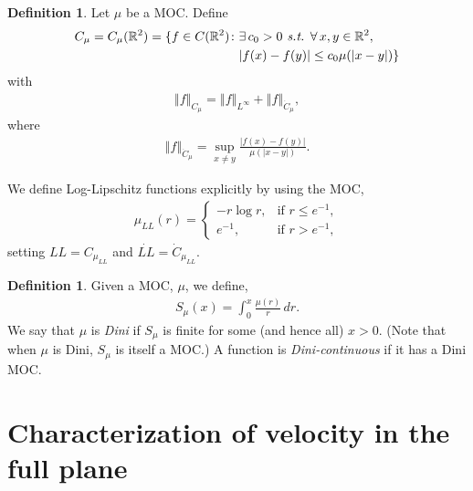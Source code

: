 \documentclass[reqno,openright,11pt,twoside]{amsart}
\theoremstyle{definition}
\newtheorem{definition}[theorem]{Definition}
\numberwithin{equation}{section}
\DeclarePairedDelimiter{\setMultiLine}{\{}{\}}
\begin{document}
\begin{definition}\label{D:Cmu}
	Let $\mu$ be a MOC. Define
	\begin{align*}
	    C_\mu
	        = C_\mu({\ensuremath{{\ensuremath{\mathbb{{R}}}}}}^2)
			= \setMultiLine{f \in C({\ensuremath{{\ensuremath{\mathbb{{R}}}}}}^2) \colon &\exists \, c_0 > 0
			    \textit{ s.t. } \forall \, x, y \in {\ensuremath{{\ensuremath{\mathbb{{R}}}}}}^2, \\
			    &{\left\vert{f(x) - f(y)}\right\vert} \le c_0 \mu({\left\vert{x - y}\right\vert})}
	\end{align*}
	with
	\begin{align*}
		{\ensuremath{\left\Vert {f} \right\Vert}}_{C_\mu}
			= {\ensuremath{\left\Vert {f} \right\Vert}}_{L^{\ensuremath{\infty}}}
				+ {\ensuremath{\left\Vert {f} \right\Vert}}_{\dot{C}_\mu},
	\end{align*}
	where
	\begin{align*}
		{\ensuremath{\left\Vert {f} \right\Vert}}_{\dot{C}_\mu}
			= \sup_{x \ne y} \frac{{\left\vert{f(x) - f(y)}\right\vert}}{\mu({\left\vert{x - y}\right\vert})}.
	\end{align*}
\end{definition}

We define Log-Lipschitz functions explicitly by using the MOC,
\begin{align}\label{e:muLL}
	\mu_{LL}(r)
		= \left\{
			\begin{array}{rl}
				-r \log r, & \text{if } r \le e^{-1}, \\
				e^{-1}, & \text{if } r > e^{-1},
			\end{array}
		\right.
\end{align}
setting $LL = C_{\mu_{LL}}$ and $\dot{LL} = \dot{C}_{\mu_{LL}}$.

\begin{definition}\label{D:Dini}
Given a MOC, $\mu$, we define,
\begin{align*}
    S_\mu(x)
        = \int_0^x  \frac{\mu(r)}{r} \, dr.
\end{align*}
We say that $\mu$ is \textit{Dini} if $S_\mu$ is finite for some (and hence all) $x > 0$. (Note that when $\mu$ is Dini, $S_\mu$ is itself a MOC.) A function is \textit{Dini-continuous} if it has a Dini MOC.
\end{definition}

\section{Characterization of velocity in the full plane}\label{S:CharacterizationSectionR2}
\end{document}
